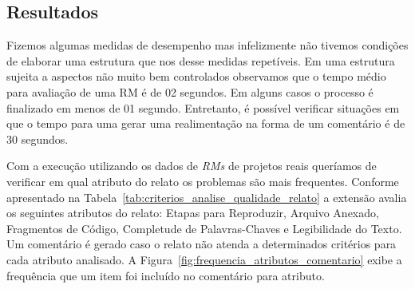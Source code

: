 \subsection{Resultados}
\label{sub:implementacao_extensao_avaliacao_resultados}

Fizemos algumas medidas de desempenho mas infelizmente não tivemos condições de
elaborar uma estrutura que nos desse medidas repetíveis. Em uma estrutura
sujeita a aspectos não muito bem controlados observamos que o tempo médio para
avaliação de uma RM é de 02 segundos. Em alguns casos o processo é finalizado em
menos de 01 segundo. Entretanto, é possível verificar situações em que o tempo
para uma gerar uma realimentação na forma de um comentário é de 30 segundos.


Com a execução utilizando os dados de \textit{RMs} de projetos reais queríamos
de verificar em qual atributo do relato os problemas são mais frequentes.
Conforme apresentado na Tabela~\ref{tab:criterios_analise_qualidade_relato} a
extensão avalia os seguintes atributos do relato: Etapas para Reproduzir,
Arquivo Anexado, Fragmentos de Código, Completude de Palavras-Chaves e
Legibilidade do Texto. Um comentário é gerado caso o relato não atenda a
determinados critérios para cada atributo analisado. A
Figura~\ref{fig:frequencia_atributos_comentario} exibe a frequência que um item
foi incluído no comentário para atributo.

